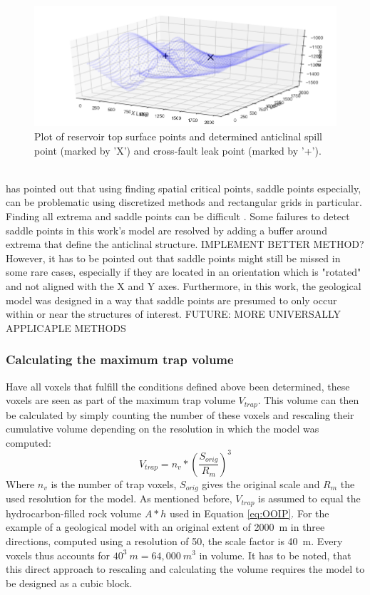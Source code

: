 			\begin{figure}[h]
				\centering
				\includegraphics[width=1\textwidth]{Figures/restop_surface_spill_leak.png}
				\caption{Plot of reservoir top surface points and determined anticlinal spill point (marked by 'X') and cross-fault leak point (marked by '+').}\label{fig:restop_surface_spill_leak}
			\end{figure}\\	
			\citet{kuijper2004detecting} has pointed out that using finding spatial critical points, saddle points especially, can be problematic using discretized methods and rectangular grids in particular. Finding all extrema and saddle points can be difficult \citep{kuijper2004detecting}. Some failures to detect saddle points in this work's model are resolved by adding a buffer around extrema that define the anticlinal structure. IMPLEMENT BETTER METHOD? However, it has to be pointed out that saddle points might still be missed in some rare cases, especially if they are located in an orientation which is "rotated" and not aligned with the X and Y axes. Furthermore, in this work, the geological model was designed in a way that saddle points are presumed to only occur within or near the structures of interest. FUTURE: MORE UNIVERSALLY APPLICAPLE METHODS
						
			\subsubsection{Calculating the maximum trap volume}
			Have all voxels that fulfill the conditions defined above been determined, these voxels are seen as part of the maximum trap volume $V_{trap}$. This volume can then be calculated by simply counting the number of these voxels and rescaling their cumulative volume depending on the resolution in which the model was computed:
			\begin{equation}
			V_{trap} = n_v*(\frac{S_{orig}}{R_{m}})^3
			\end{equation}
			Where $n_v$ is the number of trap voxels, $S_{orig}$ gives the original scale and $R_m$ the used resolution for the model. As mentioned before, $V_{trap}$ is assumed to equal the hydrocarbon-filled rock volume $A * h$ used in Equation \ref{eq:OOIP}. 
			For the example of a geological model with an original extent of 2000~m in three directions, computed using a resolution of 50, the scale factor is 40~m. Every voxels thus accounts for $40^3~m=64,000~m^3$ in volume. It has to be noted, that this direct approach to rescaling and calculating the volume requires the model to be designed as a cubic block.\\
		
